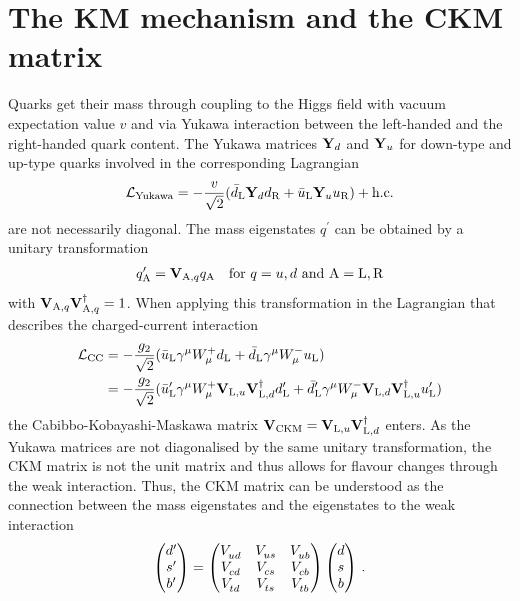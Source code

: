 
\section{The KM mechanism and the CKM matrix}
\label{sec:cpviolation:kmmechanism}

Quarks get their mass through coupling to the Higgs field with vacuum
expectation value $v$ and via Yukawa interaction between the left-handed and
the right-handed quark content. The Yukawa matrices $\mathbf{Y}_d$ and
$\mathbf{Y}_u$ for down-type and up-type quarks involved in the corresponding
Lagrangian
\begin{align}
	\mathcal{L}_{\textrm{Yukawa}} = - \frac{v}{\sqrt{2}} (\bar{d}_{\mathrm{L}} \mathbf{Y}_d d_{\mathrm{R}} + \bar{u}_{\mathrm{L}} \mathbf{Y}_u u_{\mathrm{R}}) + \text{h.c.}
\end{align}
are not necessarily diagonal. The mass eigenstates $q^{\prime}$ can be
obtained by a unitary transformation
\begin{align}
	q^{\prime}_{\mathrm{A}} = \mathbf{V}_{\mathrm{A,}q}q_{\mathrm{A}} \quad \text{for } q = u,d \text{ and } \mathrm{A} = \mathrm{L,R}
\end{align}
with $\mathbf{V}_{\mathrm{A,}q}\mathbf{V}^\dagger_{\mathrm{A,}q} = 1$. When
applying this transformation in the Lagrangian that describes the
charged-current interaction
\begin{align}
	\mathcal{L}_{\textrm{CC}} &= -\frac{g_2}{\sqrt{2}}(\bar{u}_{\mathrm{L}}\gamma^{\mu}W_{\mu}^+ d_{\mathrm{L}} + \bar{d}_{\mathrm{L}}\gamma^{\mu}W_{\mu}^-u_{\mathrm{L}})\\
	&= -\frac{g_2}{\sqrt{2}}(\bar{u}^\prime_{\mathrm{L}}\gamma^{\mu}W_{\mu}^+\mathbf{V}_{\mathrm{L,}u}\mathbf{V}^\dagger_{\mathrm{L,}d}d^\prime_{\mathrm{L}} + \bar{d}^\prime_{\mathrm{L}}\gamma^{\mu}W_{\mu}^-\mathbf{V}_{\mathrm{L,}d}\mathbf{V}^\dagger_{\mathrm{L,}u}u^\prime_{\mathrm{L}})
\end{align}
the Cabibbo-Kobayashi-Maskawa matrix $\mathbf{V}_{\text{CKM}} =
\mathbf{V}_{\mathrm{L,}u}\mathbf{V}^\dagger_{\mathrm{L,}d}$ enters. As the
Yukawa matrices are not diagonalised by the same unitary transformation, the
CKM matrix is not the unit matrix and thus allows for flavour changes through the
weak interaction. Thus, the CKM matrix can be understood as the connection
between the mass eigenstates and the eigenstates to the weak interaction
\begin{align}
\begin{pmatrix}
d^\prime \\ s^\prime \\ b^\prime
\end{pmatrix}
=
\begin{pmatrix}
{\ensuremath{V_{{u}{d}}^{}}} & {V_{{u}{s}}^{}} & {V_{{u}{b}}^{}} \\
{V_{{c}{d}}^{}} & {V_{{c}{s}}^{}} & {V_{{c}{b}}^{}} \\
{V_{{t}{d}}^{}} & {V_{{t}{s}}^{}} & {V_{{t}{b}}^{}} \\
\end{pmatrix}
\begin{pmatrix}
d	\\	s	\\	b
\end{pmatrix}
\,.
\end{align}
